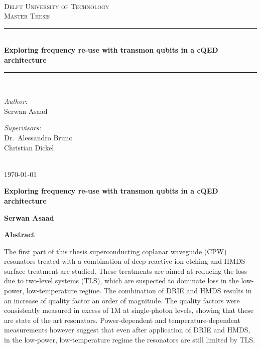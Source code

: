 \documentclass[12pt]{report}
\newcommand\blankpage{%
    \null
    \thispagestyle{empty}%
    \addtocounter{page}{-1}%
    \newpage}
\newcommand{\HRule}[1]{\rule{\linewidth}{#1}}
\begin{document}
\begin{titlepage}
\begin{center}
~\\ [4.0 cm]
\textsc{\LARGE Delft University of Technology}
\\ [3.0 cm]
\textsc{\Large Master Thesis}
\HRule{0.5 pt} \\
\LARGE \textbf{Exploring frequency re-use with transmon qubits in a cQED architecture}
\HRule{2 pt} \\ [0.5 cm]

\noindent
\begin{minipage}{0.4\textwidth}
\begin{flushleft} \large
\emph{Author:}\\
Serwan Asaad
\end{flushleft}
\end{minipage}%
\begin{minipage}{0.4\textwidth}
\begin{flushright} \large
\emph{Supervisors:} \\
Dr.~Alessandro Bruno \\
Christian Dickel
\end{flushright}
\end{minipage}
\\ [3.0 cm]
{\large \today}
\end{center}

\end{titlepage}


\author{
    Serwan Asaad
    Student ID: 4323475 \\
    Delft University of Technology \\
    Kavli Institute of Nanoscience\\
    Quantum Nanoscience Department\\
    Quantum Transport Group\\
    DiCarlo Lab}

\blankpage
\thispagestyle{plain}
\begin{center}
    \Large
    \textbf{Exploring frequency re-use with transmon qubits in a cQED architecture}


    \vspace{0.4cm}
    \textbf{Serwan Asaad}

    \vspace{0.9cm}
    \textbf{Abstract}
\end{center}
The first part of this thesis superconducting coplanar waveguide (CPW) resonators treated with a combination of deep-reactive ion etching and HMDS surface treatment are studied. These treatments are aimed at reducing the loss due to two-level systems (TLS), which are suspected to dominate loss in the low-power, low-temperature regime. The combination of DRIE and HMDS results in an increase of quality factor an order of magnitude. The quality factors were consistently measured in excess of 1M at single-photon levels, showing that these are state of the art resonators. Power-dependent and temperature-dependent measurements however suggest that even after application of DRIE and HMDS, in the low-power, low-temperature regime the resonators are still limited by TLS.
\end{document}
